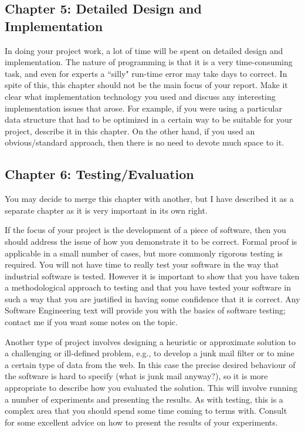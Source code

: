 \documentclass[]{final_report}
\begin{document}
\subsection{Chapter 5: Detailed Design and Implementation}

In doing your project work, a lot of time will be spent on detailed design and implementation. The nature of programming is that it is a very time-consuming task, and even for experts a ``silly" run-time error may take days to correct. In spite of this, this chapter should not be the main focus of your report. Make it clear what implementation technology you used and discuss any interesting implementation issues that arose. For example, if you were using a particular data structure that had to be optimized in a certain way to be suitable for your project, describe it in this chapter. On the other hand, if you used an obvious/standard approach, then there is no need to devote much space to it.

\subsection{Chapter 6: Testing/Evaluation}

You may decide to merge this chapter with another, but I have described it as a separate chapter as it is very important in its own right.

If the focus of your project is the development of a piece of software, then you should address the issue of how you demonstrate it to be correct. Formal proof is applicable in a small number of cases, but more commonly rigorous testing is required. You will not have time to really test your software in the way that industrial software is tested. However it is important to show that you have taken a methodological approach to testing and that you have tested your software in such a way that you are justified in having some confidence that it is correct. Any Software Engineering text will provide you with the basics of software testing; contact me if you want some notes on the topic.

Another type of project involves designing a heuristic or approximate solution to a challenging or ill-defined problem, e.g., to develop a junk mail filter or to mine a certain type of data from the web. In this case the precise desired behaviour of the software is hard to specify (what is junk mail anyway?), so it is more appropriate to describe how you evaluated the solution. This will involve running a number of experiments and presenting the results. As with testing, this is a complex area that you should spend some time coming to terms with. Consult~\cite{DAWSON:2000} for some excellent advice on how to present the results of your experiments.
\end{document}
